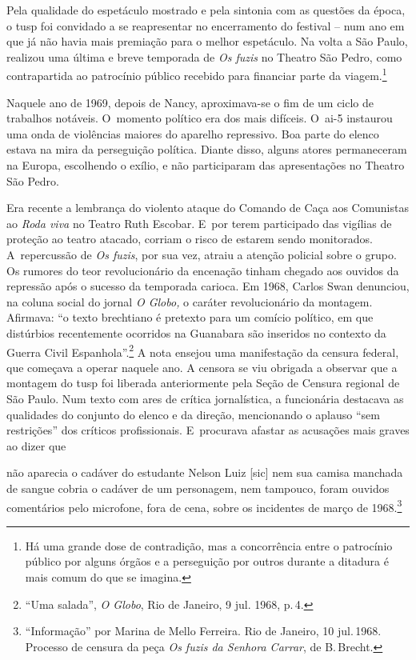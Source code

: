 Pela qualidade do espetáculo mostrado e pela sintonia com as questões da
época, o {\sc tusp} foi convidado a se reapresentar no encerramento do
festival -- num ano em que já não havia mais premiação para o melhor
espetáculo. Na volta a São Paulo, realizou uma última e breve temporada
de {\it Os fuzis} no Theatro São Pedro, como contrapartida ao patrocínio
público recebido para financiar parte da viagem.\footnote{Há uma grande
  dose de contradição, mas a concorrência entre o patrocínio público por
  alguns órgãos e a perseguição por outros durante a ditadura é mais comum
  do que se imagina.}

Naquele ano de 1969, depois de Nancy, aproximava-se o fim de um ciclo de
trabalhos notáveis. O~momento político era dos mais difíceis. O~{\sc ai}-5 instaurou uma onda de violências maiores do
aparelho repressivo. Boa parte do elenco estava na mira da perseguição
política. Diante disso, alguns atores permaneceram na Europa, escolhendo
o exílio, e não participaram das apresentações no Theatro São Pedro.

Era recente a lembrança do violento ataque do Comando de Caça aos
Comunistas ao {\it Roda viva} no Teatro Ruth Escobar. E~por terem
participado das vigílias de proteção ao teatro atacado, corriam o risco
de estarem sendo monitorados. A~repercussão de {\it Os fuzis}, por sua
vez, atraiu a atenção policial sobre o grupo. Os rumores do teor
revolucionário da encenação tinham chegado aos ouvidos da repressão após
o sucesso da temporada carioca. Em 1968, Carlos Swan denunciou, na
coluna social do jornal {\it O Globo,} o caráter revolucionário da
montagem. Afirmava: “o texto brechtiano é pretexto para um comício
político, em que distúrbios recentemente ocorridos na Guanabara são
inseridos no contexto da Guerra Civil Espanhola”.\footnote{“Uma salada”,
  {\it O Globo}, Rio de Janeiro, 9 jul. 1968, p.\,4.} A nota ensejou uma
manifestação da censura federal, que começava a operar naquele ano. A
censora se viu obrigada a observar que a montagem do {\sc tusp} foi liberada
anteriormente pela Seção de Censura regional de São Paulo. Num texto com
ares de crítica jornalística, a funcionária destacava as qualidades do
conjunto do elenco e da direção, mencionando o aplauso “sem restrições”
dos críticos profissionais. E~procurava afastar as acusações mais graves
ao dizer que

\startblockquote
não aparecia o cadáver do estudante Nelson Luiz {[}sic{]} nem sua camisa
manchada de sangue cobria o cadáver de um personagem, nem tampouco,
foram ouvidos comentários pelo microfone, fora de cena, sobre os
incidentes de março de 1968.\footnote{“Informação” por Marina de Mello
  Ferreira. Rio de Janeiro, 10 jul.\,1968. Processo de censura da
  peça {\it Os fuzis da Senhora Carrar}, de B.\,Brecht.}
\stopblockquote

